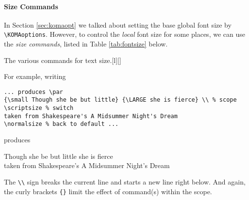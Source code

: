 \paragraph{Size Commands}
In Section \ref{sec:komaopt} we talked about setting the base global font size by \texttt{\textbackslash KOMAoptions}. However, to control the \textit{local} font size for some places, we can use the \textit{size commands}, listed in Table \ref{tab:fontsize} below.
\begin{table}[ht]
\begin{captionbeside}[test]{The various commands for text size.\footnotemark}[l][\textwidth]{
}
\end{captionbeside}
\label{tab:fontsize}
\end{table}
For example, writing
\begin{lstlisting}
... produces \par
{\small Though she be but little} {\LARGE she is fierce} \\ % scope
\scriptsize % switch
taken from Shakespeare's A Midsummer Night's Dream
\normalsize % back to default ...
\end{lstlisting}
produces \par
{\small Though she be but little} {\LARGE she is fierce} \\
\scriptsize
taken from Shakespeare's A Midsummer Night's Dream
\normalsize
\par The \texttt{\textbackslash \textbackslash} sign breaks the current line and starts a new line right below. And again, the curly brackets \verb|{}| limit the effect of command(s) within the scope.

